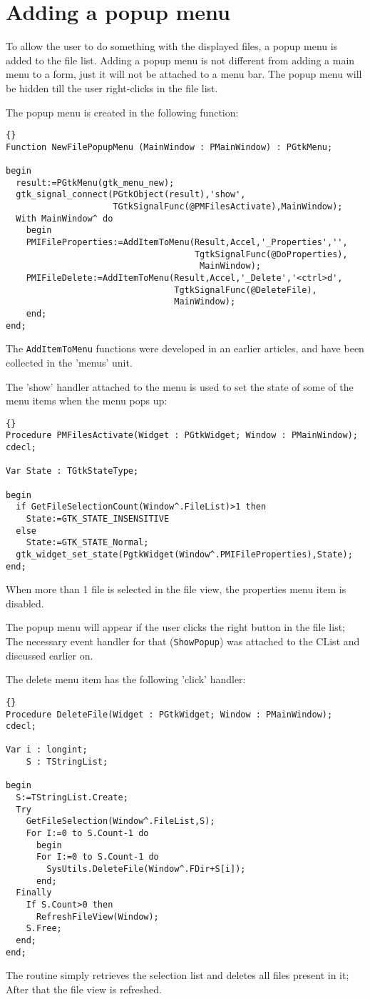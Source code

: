 \documentclass[10pt]{article}
\begin{document}
\section{Adding a popup menu}
To allow the user to do something with the displayed files, a popup menu is
added to the file list. Adding a popup menu is not different from adding a 
main menu to a form, just it will not be attached to a menu bar. The popup
menu will be hidden till the user right-clicks in the file list.

The popup menu is created in the following function:
\begin{lstlisting}{}
Function NewFilePopupMenu (MainWindow : PMainWindow) : PGtkMenu;

begin
  result:=PGtkMenu(gtk_menu_new);
  gtk_signal_connect(PGtkObject(result),'show',
                     TGtkSignalFunc(@PMFilesActivate),MainWindow);
  With MainWindow^ do
    begin
    PMIFileProperties:=AddItemToMenu(Result,Accel,'_Properties','',
                                     TgtkSignalFunc(@DoProperties),
                                      MainWindow);
    PMIFileDelete:=AddItemToMenu(Result,Accel,'_Delete','<ctrl>d',
                                 TgtkSignalFunc(@DeleteFile),
                                 MainWindow);
    end; 
end;
\end{lstlisting}
The \lstinline|AddItemToMenu| functions were developed in an earlier
articles, and have been collected in the 'menus' unit. 

The 'show' handler attached to the menu is used to set the state
of some of the menu items when the menu pops up:
\begin{lstlisting}{}
Procedure PMFilesActivate(Widget : PGtkWidget; Window : PMainWindow); cdecl;

Var State : TGtkStateType;

begin
  if GetFileSelectionCount(Window^.FileList)>1 then
    State:=GTK_STATE_INSENSITIVE
  else
    State:=GTK_STATE_Normal;
  gtk_widget_set_state(PgtkWidget(Window^.PMIFileProperties),State);
end;
\end{lstlisting}
When more than 1 file is selected in the file view, the properties menu item
is disabled. 

The popup menu will appear if the user clicks the right button in the file
list; The necessary event handler for that (\lstinline|ShowPopup|) was 
attached to the CList and discussed earlier on.

The delete menu item has the following 'click' handler:
\begin{lstlisting}{}
Procedure DeleteFile(Widget : PGtkWidget; Window : PMainWindow); cdecl;

Var i : longint;
    S : TStringList;
    
begin
  S:=TStringList.Create;
  Try
    GetFileSelection(Window^.FileList,S);
    For I:=0 to S.Count-1 do
      begin
      For I:=0 to S.Count-1 do
        SysUtils.DeleteFile(Window^.FDir+S[i]);
      end;
  Finally
    If S.Count>0 then
      RefreshFileView(Window);
    S.Free;
  end;        
end;
\end{lstlisting}
The routine simply retrieves the selection list and deletes all files
present in it; After that the file view is refreshed.
\end{document}
